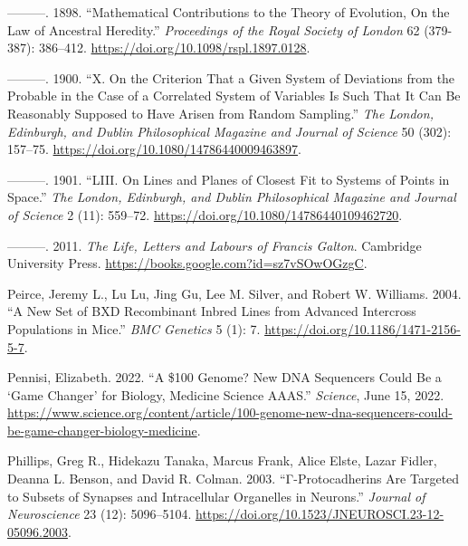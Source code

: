 \documentclass[
]{book}
\newlength{\cslhangindent}
\newlength{\cslentryspacingunit} %
\newenvironment{CSLReferences}[2] %
 {%
  \setlength{\parindent}{0pt}
  \ifodd #1
  \let\oldpar\par
  \def\par{\hangindent=\cslhangindent\oldpar}
  \fi
  \setlength{\parskip}{#2\cslentryspacingunit}
 }%
 {}
\begin{document}
\begin{CSLReferences}{1}{0}
\leavevmode{}%
---------. 1898. {``Mathematical Contributions to the Theory of Evolution, {On} the Law of Ancestral Heredity.''} \emph{Proceedings of the Royal Society of London} 62 (379-387): 386--412. \url{https://doi.org/10.1098/rspl.1897.0128}.

\leavevmode{}%
---------. 1900. {``X. {On} the Criterion That a Given System of Deviations from the Probable in the Case of a Correlated System of Variables Is Such That It Can Be Reasonably Supposed to Have Arisen from Random Sampling.''} \emph{The London, Edinburgh, and Dublin Philosophical Magazine and Journal of Science} 50 (302): 157--75. \url{https://doi.org/10.1080/14786440009463897}.

\leavevmode{}%
---------. 1901. {``{LIII}. {On} Lines and Planes of Closest Fit to Systems of Points in Space.''} \emph{The London, Edinburgh, and Dublin Philosophical Magazine and Journal of Science} 2 (11): 559--72. \url{https://doi.org/10.1080/14786440109462720}.

\leavevmode{}%
---------. 2011. \emph{The {Life}, {Letters} and {Labours} of {Francis Galton}}. {Cambridge University Press}. \url{https://books.google.com?id=sz7vSOwOGzgC}.

\leavevmode{}%
Peirce, Jeremy L., Lu Lu, Jing Gu, Lee M. Silver, and Robert W. Williams. 2004. {``A New Set of {BXD} Recombinant Inbred Lines from Advanced Intercross Populations in Mice.''} \emph{BMC Genetics} 5 (1): 7. \url{https://doi.org/10.1186/1471-2156-5-7}.

\leavevmode{}%
Pennisi, Elizabeth. 2022. {``A \$100 Genome? {New DNA} Sequencers Could Be a {`Game Changer'} for Biology, Medicine \textbar{} {Science} \textbar{} {AAAS}.''} \emph{Science}, June 15, 2022. \url{https://www.science.org/content/article/100-genome-new-dna-sequencers-could-be-game-changer-biology-medicine}.

\leavevmode{}%
Phillips, Greg R., Hidekazu Tanaka, Marcus Frank, Alice Elste, Lazar Fidler, Deanna L. Benson, and David R. Colman. 2003. {``Γ-{Protocadherins Are Targeted} to {Subsets} of {Synapses} and {Intracellular Organelles} in {Neurons}.''} \emph{Journal of Neuroscience} 23 (12): 5096--5104. \url{https://doi.org/10.1523/JNEUROSCI.23-12-05096.2003}.


\end{CSLReferences}
\end{document}
